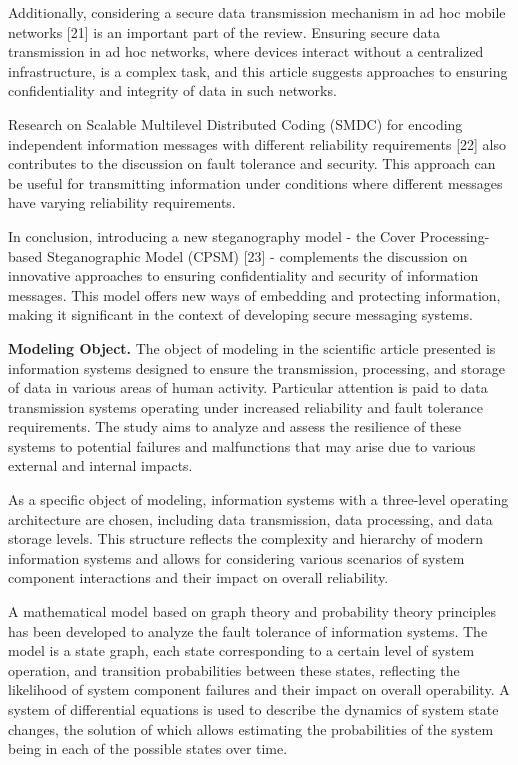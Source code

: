 \begin{multicols}{2}
Additionally, considering a secure data transmission mechanism in ad hoc
mobile networks {[}21{]} is an important part of the review. Ensuring
secure data transmission in ad hoc networks, where devices interact
without a centralized infrastructure, is a complex task, and this
article suggests approaches to ensuring confidentiality and integrity of
data in such networks.

Research on Scalable Multilevel Distributed Coding (SMDC) for encoding
independent information messages with different reliability requirements
{[}22{]} also contributes to the discussion on fault tolerance and
security. This approach can be useful for transmitting information under
conditions where different messages have varying reliability
requirements.

In conclusion, introducing a new steganography model - the Cover
Processing-based Steganographic Model (CPSM) {[}23{]} - complements the
discussion on innovative approaches to ensuring confidentiality and
security of information messages. This model offers new ways of
embedding and protecting information, making it significant in the
context of developing secure messaging systems.

{\bfseries Modeling Object.} The object of modeling in the scientific
article presented is information systems designed to ensure the
transmission, processing, and storage of data in various areas of human
activity. Particular attention is paid to data transmission systems
operating under increased reliability and fault tolerance requirements.
The study aims to analyze and assess the resilience of these systems to
potential failures and malfunctions that may arise due to various
external and internal impacts.

As a specific object of modeling, information systems with a three-level
operating architecture are chosen, including data transmission, data
processing, and data storage levels. This structure reflects the
complexity and hierarchy of modern information systems and allows for
considering various scenarios of system component interactions and their
impact on overall reliability.

A mathematical model based on graph theory and probability theory
principles has been developed to analyze the fault tolerance of
information systems. The model is a state graph, each state
corresponding to a certain level of system operation, and transition
probabilities between these states, reflecting the likelihood of system
component failures and their impact on overall operability. A system of
differential equations is used to describe the dynamics of system state
changes, the solution of which allows estimating the probabilities of
the system being in each of the possible states over time.
\end{multicols}

